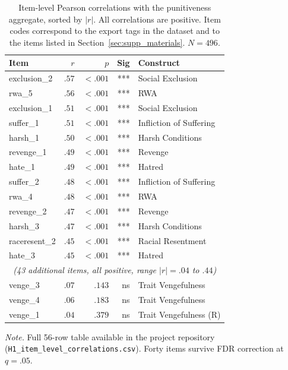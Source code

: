 \begin{table}[htbp]
  \centering
  \caption{Item-level Pearson correlations with the punitiveness aggregate, sorted by $|r|$. All correlations are positive. Item codes correspond to the export tags in the dataset and to the items listed in Section~\ref{sec:supp_materials}. $N = 496$.}
  \label{tab:item_h1}
  \footnotesize
  \begin{tabular}{lrrrl}
    \toprule
    Item & $r$ & $p$ & Sig & Construct \\
    \midrule
    exclusion\_2     & $.57$ & $<.001$ & *** & Social Exclusion \\
    rwa\_5           & $.56$ & $<.001$ & *** & RWA \\
    exclusion\_1     & $.51$ & $<.001$ & *** & Social Exclusion \\
    suffer\_1        & $.51$ & $<.001$ & *** & Infliction of Suffering \\
    harsh\_1         & $.50$ & $<.001$ & *** & Harsh Conditions \\
    revenge\_1       & $.49$ & $<.001$ & *** & Revenge \\
    hate\_1          & $.49$ & $<.001$ & *** & Hatred \\
    suffer\_2        & $.48$ & $<.001$ & *** & Infliction of Suffering \\
    rwa\_4           & $.48$ & $<.001$ & *** & RWA \\
    revenge\_2       & $.47$ & $<.001$ & *** & Revenge \\
    harsh\_3         & $.47$ & $<.001$ & *** & Harsh Conditions \\
    raceresent\_2    & $.45$ & $<.001$ & *** & Racial Resentment \\
    hate\_3          & $.45$ & $<.001$ & *** & Hatred \\
    \multicolumn{5}{c}{\textit{(43 additional items, all positive, range $|r| = .04$ to $.44$)}} \\
    venge\_3         & $.07$ & $.143$  & ns  & Trait Vengefulness \\
    venge\_4         & $.06$ & $.183$  & ns  & Trait Vengefulness \\
    venge\_1         & $.04$ & $.379$  & ns  & Trait Vengefulness (R) \\
    \bottomrule
  \end{tabular}

  \vspace{0.3em}
  \footnotesize
  \textit{Note.} Full 56-row table available in the project repository (\texttt{H1\_item\_level\_correlations.csv}). Forty items survive FDR correction at $q = .05$.
\end{table}


